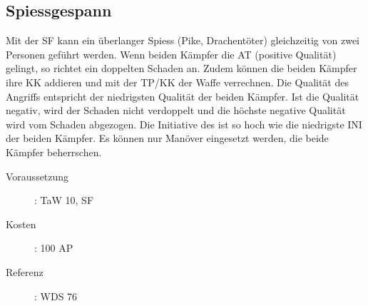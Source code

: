 \subsection{Spiessgespann}
\label{sf.spiessgespann}
Mit der SF  kann ein überlanger Spiess (Pike, Drachentöter) gleichzeitig von zwei Personen geführt werden.
Wenn beiden Kämpfer die AT (positive Qualität) gelingt, so richtet ein  doppelten Schaden an.
Zudem können die beiden Kämpfer ihre KK addieren und mit der TP/KK der Waffe verrechnen.
Die Qualität des Angriffs entspricht der niedrigsten Qualität der beiden Kämpfer.
Ist die Qualität negativ, wird der Schaden nicht verdoppelt und die höchste negative Qualität wird vom Schaden abgezogen.
Die Initiative des  ist so hoch wie die niedrigste INI der beiden Kämpfer.
Es können nur Manöver eingesetzt werden, die beide Kämpfer beherrschen.
\begin{description}
    \item[Voraussetzung]:
        TaW  10, SF 
    \item [Kosten]:
        100 AP
    \item [Referenz]:
        WDS 76
\end{description}

